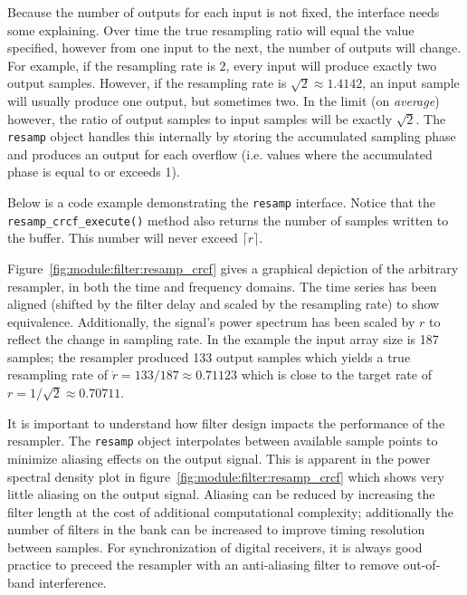 Because the number of outputs for each input is not fixed, the interface needs
some explaining.
Over time the true resampling ratio will equal the value specified, however
from one input to the next, the number of outputs will change.
For example, if the resampling rate is $2$, every input will produce exactly
two output samples.
However, if the resampling rate is $\sqrt{2} \approx 1.4142$, an input sample
will usually produce one output, but sometimes two.
In the limit (on {\it average}) however, the ratio of output samples to input
samples will be exactly $\sqrt{2}$.
The {\tt resamp} object handles this internally by storing the accumulated
sampling phase and produces an output for each overflow (i.e. values where the
accumulated phase is equal to or exceeds 1).

Below is a code example demonstrating the {\tt resamp} interface.
Notice that the {\tt resamp\_crcf\_execute()} method also returns the number
of samples written to the buffer.
This number will never exceed $\lceil r \rceil$.
%

%
Figure~\ref{fig:module:filter:resamp_crcf} gives a graphical depiction
of the arbitrary resampler, in both the time and frequency domains.
The time series has been aligned (shifted by the filter delay and scaled by
the resampling rate) to show equivalence.
Additionally, the signal's power spectrum has been scaled by $r$ to reflect
the change in sampling rate.
In the example the input array size is 187 samples;
the resampler produced 133 output samples which yields a true resampling
rate of $\dot{r} = 133/187 \approx 0.71123$ which is close to the target
rate of $r = 1/\sqrt{2} \approx 0.70711$.

It is important to understand how filter design impacts the performance of the
resampler.
The {\tt resamp} object interpolates between available sample points to
minimize aliasing effects on the output signal.
This is apparent in the power spectral density plot in
figure~\ref{fig:module:filter:resamp_crcf} which shows very little aliasing on
the output signal.
Aliasing can be reduced by increasing the filter length at the cost of
additional computational complexity;
additionally the number of filters in the bank can be increased to
improve timing resolution between samples.
For synchronization of digital receivers, it is always good practice to
preceed the resampler with an anti-aliasing filter to remove out-of-band
interference.

